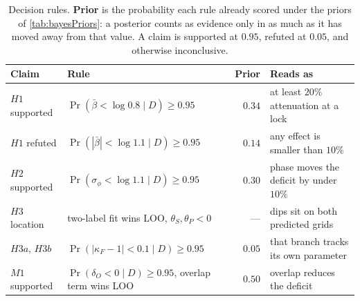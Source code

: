 \begin{table}[t]
    \centering
    \small
    \begin{tabular}{@{}llrl@{}}
        \toprule
        \textbf{Claim} & \textbf{Rule} & \textbf{Prior} & \textbf{Reads as} \\
        \midrule
        $H1$ supported & $\Pr(\bar\beta < \log 0.8 \mid D) \ge 0.95$   & $0.34$ & at least $20\%$ attenuation at a lock \\
        $H1$ refuted   & $\Pr(|\bar\beta| < \log 1.1 \mid D) \ge 0.95$ & $0.14$ & any effect is smaller than $10\%$ \\
        $H2$ supported & $\Pr(\sigma_\phi < \log 1.1 \mid D) \ge 0.95$ & $0.30$ & phase moves the deficit by under $10\%$ \\
        $H3$ location  & two-label fit wins LOO, $\theta_S,\theta_P<0$ & ---    & dips sit on both predicted grids \\
        $H3a$, $H3b$   & $\Pr(|\kappa_F - 1| < 0.1 \mid D) \ge 0.95$   & $0.05$ & that branch tracks its own parameter \\
        $M1$ supported & $\Pr(\delta_O < 0 \mid D) \ge 0.95$, overlap term wins LOO & $0.50$ & overlap reduces the deficit \\
        \bottomrule
    \end{tabular}
    \caption{Decision rules. \textbf{Prior} is the probability each rule already scored under the priors of \autoref{tab:bayesPriors}: a posterior counts as evidence only in as much as it has moved away from that value. A claim is supported at $0.95$, refuted at $0.05$, and otherwise inconclusive.}
    \label{tab:bayesDecisions}
\end{table}
